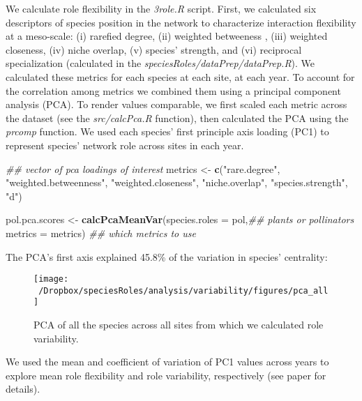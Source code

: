 \documentclass[
]{article}
\newenvironment{Shaded}{\begin{snugshade}}{\end{snugshade}}
\newcommand{\CommentTok}[1]{\textcolor[rgb]{0.56,0.35,0.01}{\textit{#1}}}
\newcommand{\DataTypeTok}[1]{\textcolor[rgb]{0.13,0.29,0.53}{#1}}
\newcommand{\KeywordTok}[1]{\textcolor[rgb]{0.13,0.29,0.53}{\textbf{#1}}}
\newcommand{\NormalTok}[1]{#1}
\newcommand{\StringTok}[1]{\textcolor[rgb]{0.31,0.60,0.02}{#1}}
\begin{document}
We calculate role flexibility in the \emph{3role.R} script. First, we
calculated six descriptors of species position in the network to
characterize interaction flexibility at a meso-scale: (i) rarefied
degree, (ii) weighted betweeness , (iii) weighted closeness, (iv) niche
overlap, (v) species' strength, and (vi) reciprocal specialization
(calculated in the \emph{speciesRoles/dataPrep/dataPrep.R}). We
calculated these metrics for each species at each site, at each year. To
account for the correlation among metrics we combined them using a
principal component analysis (PCA). To render values comparable, we
first scaled each metric across the dataset (see the
\emph{src/calcPca.R} function), then calculated the PCA using the
\emph{prcomp} function. We used each species' first principle axis
loading (PC1) to represent species' network role across sites in each
year.

\begin{Shaded}
\begin{Highlighting}[]
\CommentTok{\#\# vector of pca loadings of interest}
\NormalTok{metrics \textless{}{-}}\StringTok{ }\KeywordTok{c}\NormalTok{(}\StringTok{"rare.degree"}\NormalTok{, }\StringTok{"weighted.betweenness"}\NormalTok{, }\StringTok{"weighted.closeness"}\NormalTok{,}
             \StringTok{"niche.overlap"}\NormalTok{, }\StringTok{"species.strength"}\NormalTok{, }\StringTok{"d"}\NormalTok{)}

\NormalTok{pol.pca.scores \textless{}{-}}\StringTok{ }\KeywordTok{calcPcaMeanVar}\NormalTok{(}\DataTypeTok{species.roles =}\NormalTok{ pol,}\CommentTok{\#\# plants or pollinators}
                                 \DataTypeTok{metrics =}\NormalTok{ metrics) }\CommentTok{\#\# which metrics to use }
\end{Highlighting}
\end{Shaded}

The PCA's first axis explained 45.8\% of the variation in species'
centrality:

\begin{figure}[H]
\texttt{[image: ~/Dropbox/speciesRoles/analysis/variability/figures/pca\_all]} \caption{PCA of all the species across all sites from which we calculated role variability.}\label{fig:unnamed-chunk-4}
\end{figure}

We used the mean and coefficient of variation of PC1 values across years
to explore mean role flexibility and role variability, respectively (see
paper for details).
\end{document}
